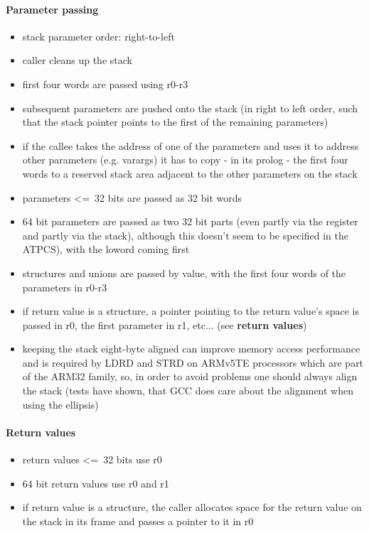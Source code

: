 \paragraph{Parameter passing}

\begin{itemize}
\item stack parameter order: right-to-left
\item caller cleans up the stack
\item first four words are passed using r0-r3
\item subsequent parameters are pushed onto the stack (in right to left order, such that the stack pointer points to the first of the remaining parameters)
\item if the callee takes the address of one of the parameters and uses it to address other parameters (e.g. varargs) it has to copy - in its prolog - the first four words to a reserved stack area adjacent to the other parameters on the stack
\item parameters \textless=\ 32 bits are passed as 32 bit words
\item 64 bit parameters are passed as two 32 bit parts (even partly via the register and partly via the stack), although this doesn't seem to be specified in the ATPCS), with the loword coming first
\item structures and unions are passed by value, with the first four words of the parameters in r0-r3
\item if return value is a structure, a pointer pointing to the return value's space is passed in r0, the first parameter in r1, etc... (see {\bf return values})
\item keeping the stack eight-byte aligned can improve memory access performance and is required by LDRD and STRD on ARMv5TE processors which are part of the ARM32 family, so, in order to avoid problems one should always align the stack (tests have shown, that GCC does care about the alignment when using the ellipsis)
\end{itemize}

\paragraph{Return values}
\begin{itemize}
\item return values \textless=\ 32 bits use r0
\item 64 bit return values use r0 and r1
\item if return value is a structure, the caller allocates space for the return value on the stack in its frame and passes a pointer to it in r0
\end{itemize}

